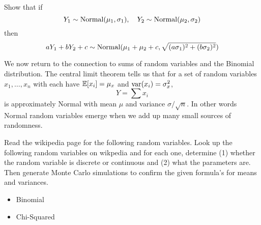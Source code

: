\begin{example}
Show that if 
\begin{equation}
Y_1 \sim {\rm Normal}(\mu_1,\sigma_1),\quad Y_2 \sim {\rm Normal}(\mu_2,\sigma_2)
\end{equation}
then 
\begin{equation}
aY_1 + bY_2 + c \sim {\rm Normal}(\mu_1+\mu_2 + c,\sqrt{(a\sigma_1)^2 + (b\sigma_2)^2})
\end{equation}
\end{example}

We now return to the connection to sums of random variables and the Binomial distribution. The {\dfn central limit theorem} tells us that for a set of random variables $x_1,\dots,x_n$ with each have $\mathbb E[x_i] = \mu_x$ and ${\rm var}(x_i) = \sigma_x^2$, 
\begin{equation}
Y = \sum x_i  
\end{equation}
is approximately Normal with mean $\mu$ and variance $\sigma/\sqrt{n}$. 
In other words Normal random variables emerge when we add up many small sources of randomness. 




\begin{exercise}
Read the wikipedia page for the following random variables. Look up the following random variables on wikpedia and for each one, determine (1) whether the random variable is discrete or continuous and (2) what the parameters are. Then generate Monte Carlo simulations to confirm the given formula's for means and variances.  
\begin{itemize}
\item Binomial
\item Chi-Squared
\end{itemize}
\end{exercise}


\begin{solution}
\end{solution}








